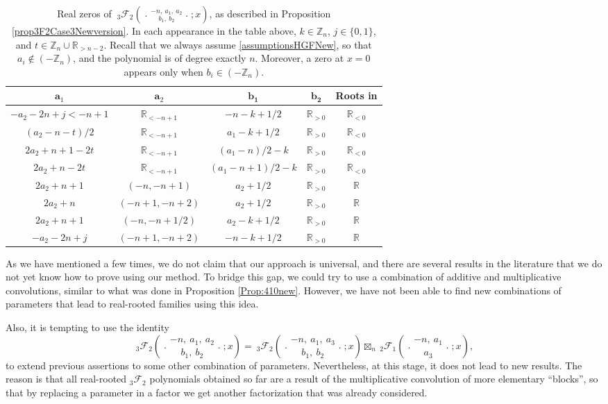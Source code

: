 \documentclass[reqno,11pt]{amsart}
\theoremstyle{remark}
\newcommand{\Z}{\mathbb{Z}}
\newcommand{\rr}{\mathbb{R}}
\newcommand*\pFq[5]{%
 {\ }_{#1}{\mathcal F}_{#2}{\left(\genfrac..{0pt}{}{#3}{#4};#5\right)}%
}
\begin{document}
\begin{table}[hb]
    \centering
    \begin{tabular}{|c|c|c|c|c|}
    \hline $\mathbf{a}_1$ &  $\mathbf{a}_2$ & $\mathbf{b_1}$&$\mathbf{b_2}$ & \textbf{Roots in}  \\
\hline $-a_2-2n+j<-n+1$     & $\mathbb{R}_{< -n+1}$ & $-n-k+1/2$ & $\mathbb{R}_{>0}$ 
& $\mathbb{R}_{< 0}$  \\
\hline $(a_2-n-t)/2$  & $\mathbb{R}_{< -n+1}$ & $a_1-k+1/2$ & $\mathbb{R}_{>0}$ 
& $\mathbb{R}_{< 0}$  \\
\hline $ 2a_2+n+1-2t$  & $\mathbb{R}_{< -n+1}$ & $(a_1-n)/2-k$  & $\mathbb{R}_{>0}$ 
& $\mathbb{R}_{< 0}$  \\
\hline $ 2a_2+n-2t$ & $\mathbb{R}_{< -n+1}$ & $(a_1-n+1)/2-k$  & $\mathbb{R}_{>0}$ 
& $\mathbb{R}_{< 0}$  \\
\hline $2a_2+n+1$ & $(-n, -n+1)$ & $a_2 +1/2$  & $\mathbb{R}_{>0}$ 
& $\mathbb{R} $  \\
\hline $2a_2+n$ & $(-n+1, -n+2)$ &  $a_2 +1/2$   & $\mathbb{R}_{>0}$ 
& $\mathbb{R} $  \\
\hline $2a_2+n+1$ & $(-n, -n+1/2)$ & $a_2-k+1/2$   & $\mathbb{R}_{>0}$ 
& $\mathbb{R} $  \\
 \hline $-a_2-2n+j$   & $(-n+1, -n+2)$ & $-n-k+1/2$    & $ \mathbb{R}_{>0}$ 
 & $\mathbb{R} $  \\
\hline
\end{tabular}
\vspace{2mm}
\caption{Real zeros of $\pFq{3}{2}{-n,\  a_1,\ a_2}{ b_1,\ b_2}{x}$, as described in Proposition \ref{prop3F2Case3Newversion}. In each appearance in the table above, $k\in \mathbb Z_n $, $j\in \{0,1\}$, and $t\in \mathbb Z_n \cup  \rr_{>n-2}$. Recall that we always assume \eqref{assumptionsHGFNew}, so that $  a_i \notin (-\Z_n)$, and the polynomial is of degree exactly $n$. Moreover, a zero at $x=0$ appears only when $b_i \in (-\Z_n)$.
  }
    \label{tab:3F2case3}
\end{table}

As we have mentioned a few times, we do not claim that our approach is universal, and there are several results in the literature that we do not yet know how to prove using our method. To bridge this gap, we could try to use a combination of additive and multiplicative convolutions, similar to what was done in Proposition \ref{Prop:410new}. However, we have not been able to find new combinations of parameters that lead to real-rooted families using this idea.

Also, it is tempting to use the identity 
\begin{equation}
    \label{multIdentityCancellation3}
    \pFq{3}{2}{-n,\ a_1, \ a_2}{b_1,\ b_2}{x}=\pFq{3}{2}{-n,\ a_1, \ a_3}{b_1, \ b_2}{x} \boxtimes_n \pFq{2}{1}{-n, \ a_1 }{a_3 }{x},
\end{equation}
to extend previous assertions to some other combination of parameters. Nevertheless, at this stage, it does not lead to new results. The reason is that all real-rooted  ${}_3\mathcal{F}_2$ polynomials obtained so far are a result of the multiplicative convolution of more elementary ``blocks'', so that by replacing a parameter in a factor we get another factorization that was already considered.
\end{document}

